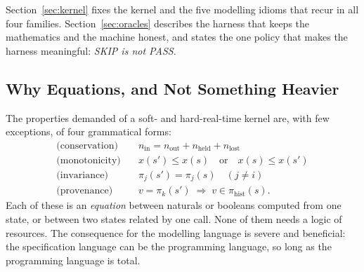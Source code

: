\documentclass[10pt,journal,compsoc,twocolumn]{article}
\theoremstyle{definition}
\theoremstyle{remark}
\theoremstyle{plain}
\begin{document}
Section~\ref{sec:kernel} fixes the kernel and the five modelling idioms that recur in all four families. Section~\ref{sec:oracles} describes the harness that keeps the mathematics and the machine honest, and states the one policy that makes the harness meaningful: \emph{SKIP is not PASS}.

\subsection{Why Equations, and Not Something Heavier}
The properties demanded of a soft- and hard-real-time kernel are, with few exceptions, of four grammatical forms:
\begin{equation}
\label{eq:fourforms}
\begin{aligned}
\text{(conservation)}\quad & n_{\text{in}} = n_{\text{out}} + n_{\text{held}} + n_{\text{lost}} \\
\text{(monotonicity)}\quad & x(s') \le x(s) \quad \text{or} \quad x(s) \le x(s') \\
\text{(invariance)}\quad & \pi_j(s') = \pi_j(s) \quad (j \ne i) \\
\text{(provenance)}\quad & v = \pi_k(s') \;\Rightarrow\; v \in \pi_{\text{hist}}(s).
\end{aligned}
\end{equation}
Each of these is an \emph{equation} between naturals or booleans computed from one state, or between two states related by one call. None of them needs a logic of resources. The consequence for the modelling language is severe and beneficial: the specification language can be the programming language, so long as the programming language is total.
\end{document}
